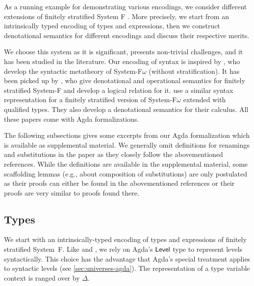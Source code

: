 \documentclass[manuscript,screen,review,anonymous]{acmart}
\begin{document}
As a running example for demonstrating various encodings, we consider
different extensions of finitely stratified System F
\cite{DBLP:journals/iandc/Leivant91}. More precisely, we start from an
intrinsically typed encoding of types and expressions, then we
construct denotational semantics for different encodings and discuss
their respective merits.

We choose this system as it is significant, presents non-trivial
challenges, and it has been studied in the literature. Our encoding of
syntax is inspired by \citet{DBLP:conf/mpc/ChapmanKNW19}, who develop
the syntactic metatheory of System-F$\omega$ (without
stratification). It has been  picked up by
\citet{DBLP:conf/tyde/Saffrich0W24}, who give denotational and operational semantics
for finitely stratified System-F and develop a logical relation for
it. \citet{DBLP:journals/pacmpl/HubersM23} use a similar syntax
representation for a finitely stratified version of System-F$\omega$
extended with qualified types. They also develop a denotational
semantics for their calculus. All these papers come with Agda
formalizations. 

The following subsections gives some excerpts from our Agda
formalization which is available as supplemental material. We
generally omit definitions for renamings and substitutions in the
paper as they closely follow the abovementioned references. While the
definitions are available in the supplemental material, some
scaffolding lemmas (e.g., about composition of substitutions) are only
postulated as their proofs can either be found in the abovementioned
references or their proofs are very similar to proofs found there. 

\subsection{Types}
\label{sec:syntax-types}

We start with an intrinsically-typed encoding of types and expressions
of finitely stratified System~F. Like
\citet{DBLP:conf/tyde/Saffrich0W24} and
\citet{DBLP:journals/pacmpl/HubersM23}, we rely on Agda's $\ALevel$
type to represent levels syntactically. This choice has the advantage
that Agda's special treatment applies to syntactic levels (see
\ref{sec:universes-agda}). The representation of a type variable
context is {\SFTEnv} ranged over by $\Delta$.
\end{document}
